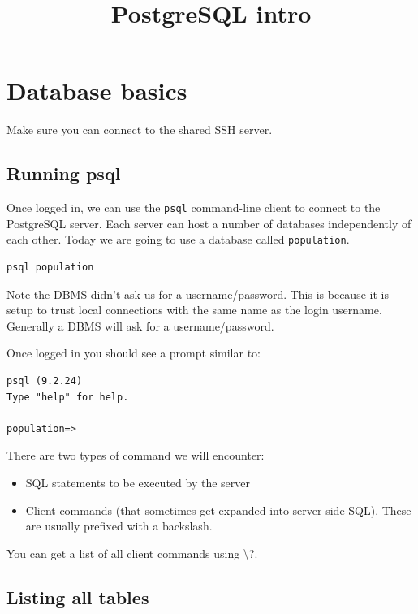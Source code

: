 \documentclass{pgnotes}
\title{PostgreSQL intro}
\begin{document}
\maketitle

\section{Database basics}\label{database-basics}

Make sure you can connect to the shared SSH server.

\subsection{Running psql}\label{running-psql}

Once logged in, we can use the \texttt{psql} command-line client to connect to the PostgreSQL server.
Each server can host a number of databases independently of each other.
Today we are going to use a database called \texttt{population}.

\begin{verbatim}
psql population
\end{verbatim}

Note the DBMS didn't ask us for a username/password.
This is because it is setup to trust local connections with the same name as the login username.
Generally a DBMS will ask for a username/password.

Once logged in you should see a prompt similar to:

\begin{verbatim}
psql (9.2.24)
Type "help" for help.

population=> 
\end{verbatim}

There are two types of command we will encounter:

\begin{itemize}
\item
  SQL statements to be executed by the server
\item
  Client commands (that sometimes get expanded into server-side SQL).
  These are usually prefixed with a backslash.
\end{itemize}

You can get a list of all client commands using \textbackslash{}?.

\subsection{Listing all tables}\label{listing-all-tables}
\end{document}
